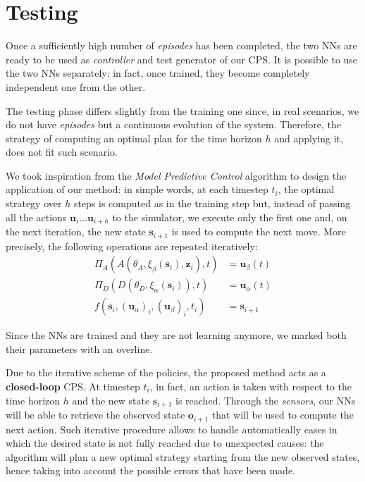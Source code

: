 \section{Testing}
Once a sufficiently high number of \textit{episodes} has been completed, the two NNs are ready to be used as \textit{controller} and {test generator} of our CPS.
It is possible to use the two NNs separately: in fact, once trained, they become completely independent one from the other.

The testing phase differs slightly from the training one since, in real scenarios, we do not have \textit{episodes} but a continuous evolution of the system.
Therefore, the strategy of computing an optimal plan for the time horizon $h$ and applying it, does not fit such scenario.

We took inspiration from the \textit{Model Predictive Control} algorithm \cite{mpc} to design the application of our method: in simple words, at each timestep $t_i$, the optimal strategy over $h$ steps is computed as in the training step but, instead of passing all the actions $\textbf{u}_i \dots \textbf{u}_{i + h}$ to the simulator, we execute only the first one and, on the next iteration, the new state $\textbf{s}_{i + 1}$ is used to compute the next move.
More precisely, the following operations are repeated iteratively:
\begin{align*}
 \Pi_A(A(\overline{\theta_A}, \xi_\beta(\textbf{s}_i), \textbf{z}_i), t) & = \textbf{u}_\beta(t) \\
 \Pi_D(D(\overline{\theta_D},  \xi_\alpha(\textbf{s}_i)), t) & = \textbf{u}_\alpha(t) \\
 f(\textbf{s}_i, (\textbf{u}_\alpha)_i, (\textbf{u}_\beta)_i, t_i) & = \textbf{s}_{i + 1}
\end{align*}

Since the NNs are trained and they are not learning anymore, we marked both their parameters with an overline.

Due to the iterative scheme of the policies, the proposed method acts as a \textbf{closed-loop} CPS.
At timestep $t_i$, in fact, an action is taken with respect to the time horizon $h$ and the new state $\textbf{s}_{i+1}$ is reached.
Through the \textit{sensors}, our NNs will be able to retrieve the observed state $\textbf{o}_{i+1}$ that will be used to compute the next action.
Such iterative procedure allows to handle automatically cases in which the desired state is not fully reached due to unexpected causes: the algorithm will plan a new optimal strategy starting from the new observed states, hence taking into account the possible errors that have been made.

